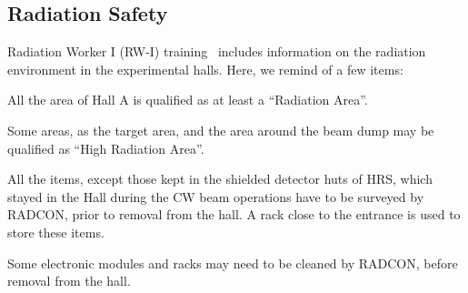 

\begin{safetyen}{10}{10}
\subsection{Radiation Safety}
\end{safetyen}

Radiation Worker I (RW-I) training~\cite{RWIcebaf} includes information on the
radiation environment in the experimental halls. Here, we remind of a few items:
 \begin{list}{--}{\setlength{\itemsep}{-0.2cm}}
    \item All the area of Hall A is qualified as at least a ``Radiation Area''.
    \item Some areas, as the target area, and the area around the beam dump may be qualified as ``High Radiation Area''.
    \item All the items, except those kept in the shielded detector huts of HRS, 
          which stayed in the Hall during the CW beam operations
          have to be surveyed by RADCON, prior to removal from the hall. 
          A rack close to the entrance is used to store these items.
    \item Some electronic modules and racks may need to be cleaned by RADCON, before
          removal from the hall.        
 \end{list}
 
%
%
%
%
%
